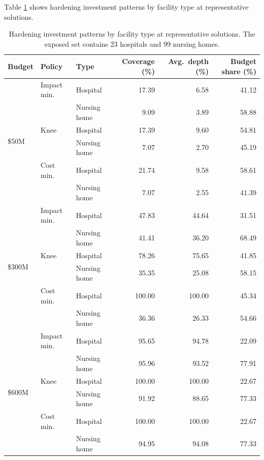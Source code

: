 \documentclass[preprint,11pt,authoryear]{elsarticle}
\begin{document}
Table \ref{tbl:supp_facility_type_investment} shows hardening investment patterns by facility type at representative
solutions. 

\begin{table}[!t]
\centering
\small
\setlength{\tabcolsep}{4pt}
\caption{Hardening investment patterns by facility type at representative
solutions. The exposed set contains 23 hospitals and 99 nursing homes.}
\label{tbl:supp_facility_type_investment}
\begin{tabular}{lllrrr}
\toprule
Budget & Policy & Type & Coverage (\%) & Avg.\ depth (\%) & Budget share (\%) \\
\midrule

\multirow{6}{*}{\$50M}
& Impact min. & Hospital     & 17.39 & 6.58 & 41.12 \\
&             & Nursing home & 9.09 & 3.89 & 58.88 \\
\cmidrule(lr){2-6}
& Knee        & Hospital     & 17.39 & 9.60 & 54.81 \\
&             & Nursing home & 7.07 & 2.70 & 45.19 \\
\cmidrule(lr){2-6}
& Cost min.   & Hospital     & 21.74 & 9.58 & 58.61 \\
&             & Nursing home & 7.07 & 2.55 & 41.39 \\

\midrule

\multirow{6}{*}{\$300M}
& Impact min. & Hospital     & 47.83 & 44.64 & 31.51 \\
&             & Nursing home & 41.41 & 36.20 & 68.49 \\
\cmidrule(lr){2-6}
& Knee        & Hospital     & 78.26 & 75.65 & 41.85 \\
&             & Nursing home & 35.35 & 25.08 & 58.15 \\
\cmidrule(lr){2-6}
& Cost min.   & Hospital     & 100.00 & 100.00 & 45.34 \\
&             & Nursing home & 36.36 & 26.33 & 54.66 \\

\midrule

\multirow{6}{*}{\$600M}
& Impact min. & Hospital     & 95.65 & 94.78 & 22.09 \\
&             & Nursing home & 95.96 & 93.52 & 77.91 \\
\cmidrule(lr){2-6}
& Knee        & Hospital     & 100.00 & 100.00 & 22.67 \\
&             & Nursing home & 91.92 & 88.65 & 77.33 \\
\cmidrule(lr){2-6}
& Cost min.   & Hospital     & 100.00 & 100.00 & 22.67 \\
&             & Nursing home & 94.95 & 94.08 & 77.33 \\

\bottomrule
\end{tabular}
\end{table}
\end{document}
